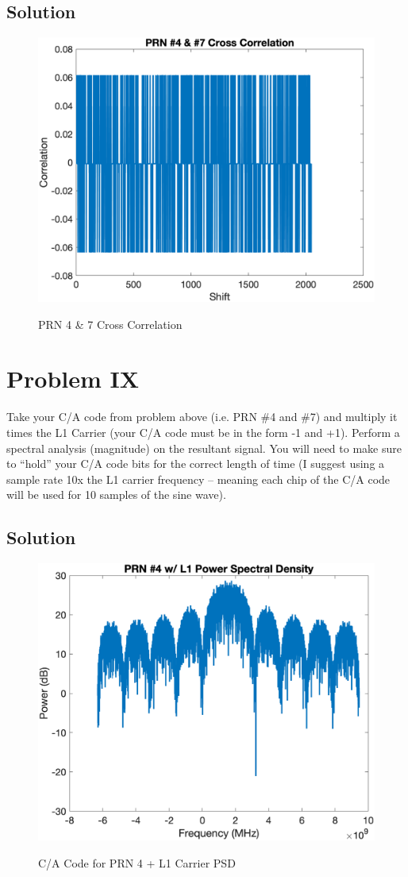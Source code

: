 \documentclass{article}
\begin{document}
\subsection*{Solution}
\begin{figure}[H]
    \centering
    \includegraphics[width=0.75\linewidth]{../figures/p8_prn47_xcorr.png}\label{p8_prn47_xcorr}
    \caption{PRN 4 \& 7 Cross Correlation}
\end{figure}

\section*{Problem IX}
Take your C/A code from problem above (i.e. PRN \#4 and \#7) and multiply it times the L1
Carrier (your C/A code must be in the form -1 and +1). Perform a spectral analysis
(magnitude) on the resultant signal. You will need to make sure to “hold” your C/A code bits
for the correct length of time (I suggest using a sample rate 10x the L1 carrier frequency –
meaning each chip of the C/A code will be used for 10 samples of the sine wave).

\subsection*{Solution}
\begin{figure}[H]
    \centering
    \includegraphics[width=0.75\linewidth]{../figures/p9_prn4_psd.png}\label{p9_prn4_psd}
    \caption{C/A Code for PRN 4 + L1 Carrier PSD}
\end{figure}
\end{document}
